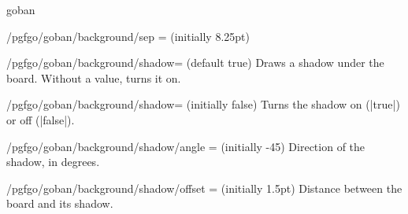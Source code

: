 \begin{environment}{{goban}}
\begin{key}{/pgfgo/goban/background/sep = (initially 8.25pt)}
\begin{codeexample}[]
			\begin{goban}[background = {sep = 0.625em}, name = a]
			\end{goban}

			\begin{goban}[background = {sep = 1.5em}, resume = a]
			\end{goban}
		\end{codeexample}
	\end{key}

	\begin{key}{/pgfgo/goban/background/shadow= (default true)}
		Draws a shadow under the board. Without a value, turns it on.
		\begin{codeexample}[]

			\begin{goban}[background = {shadow}, name = a]
			\end{goban}

			\begin{goban}[background = {shadow = {color = blue, opacity = 0.3}}, resume = a]
			\end{goban}
		\end{codeexample}
	\end{key}

	\begin{key}{/pgfgo/goban/background/shadow= (initially false)}
		Turns the shadow on (|true|) or off (|false|).
	\end{key}

	\begin{key}{/pgfgo/goban/background/shadow/angle = (initially -45)}
		Direction of the shadow, in degrees.
		\begin{codeexample}[]

			\begin{goban}[background = {shadow}, name = a]
			\end{goban}

			\begin{goban}[background = {shadow = {angle = 45}}, resume = a]
			\end{goban}
		\end{codeexample}
	\end{key}

	\begin{key}{/pgfgo/goban/background/shadow/offset = (initially 1.5pt)}
		Distance between the board and its shadow.
		\begin{codeexample}[]


\end{codeexample}
\end{key}
\end{environment}
